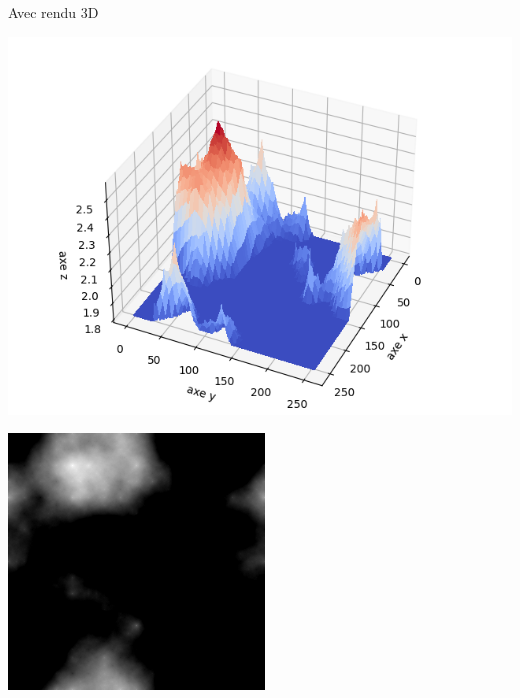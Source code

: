 \documentclass[11pt,class=report,crop=false]{standalone}
\begin{document}
\begin{exemple}
Avec rendu 3D
\begin{center}

\begin{minipage}{0.4\textwidth}
\includegraphics[scale=\myscale,scale=0.5]{figures/hauteurs-04}
\end{minipage}\qquad
\begin{minipage}{0.4\textwidth}
\includegraphics[scale=\myscale,scale=0.5]{figures/hauteurs-05}
\end{minipage}

\smallskip


\end{center}
\end{exemple}
\end{document}
